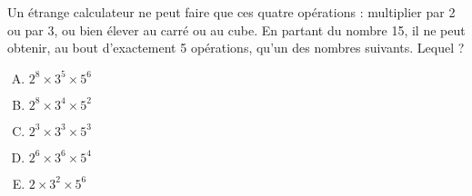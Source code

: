 Un étrange calculateur ne peut faire que ces quatre opérations :
multiplier par 2 ou par 3, ou bien élever au carré ou au cube. En
partant du nombre 15, il ne peut obtenir, au bout d'exactement 5
opérations, qu'un des nombres suivants. Lequel ?
\begin{multicols}{5}
  \begin{enumerate}[A)]
  \item $2^8\times3^5\times5^6$
  \item $2^8\times3^4\times5^2$
  \item $2^3\times3^3\times5^3$
  \item $2^6\times3^6\times5^4$
  \item $2\times3^2\times5^6$
  \end{enumerate}
\end{multicols}